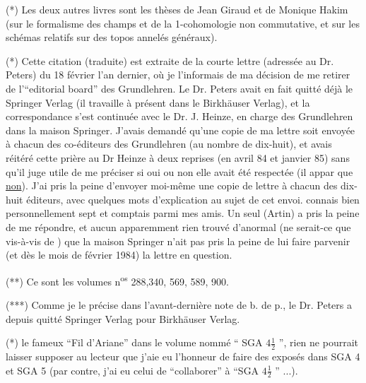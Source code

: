 (*\deleted{*}) Les deux autres livres sont les thèses de Jean Giraud et de  Monique Hakim (sur le formalisme des champs et de la 1-cohomologie non commutative, et sur les schémas relatifs sur des topos annelés généraux).

(*) Cette citation (traduite) est extraite de la courte lettre (adressée au Dr. Peters) du 18 février l'an dernier, où je l'informais de ma décision de me retirer de l'``editorial board'' des Grundlehren. Le Dr. Peters avait en fait quitté déjà le Springer Verlag (il travaille à présent dans le Birkhäuser Verlag), et la correspondance s'est continuée avec le  Dr. J. Heinze, en charge des Grundlehren dans la maison Springer. J'avais demandé qu'une copie de ma lettre soit envoyée à chacun des co-éditeurs des Grundlehren (au nombre de dix-huit), et avais réitéré cette prière\deleted{,} au Dr Heinze\deleted{,} à deux reprises (en avril 84 et janvier 85) sans qu'il juge utile de me  préciser si oui ou non elle avait été respectée (il  appar que \uline{non}). J'ai pris la peine d'envoyer moi-même une copie de  lettre  à chacun des dix-huit éditeurs, avec quelques mots d'explication  au sujet de cet envoi.  connais bien personnellement sept   et   comptais parmi mes amis. Un seul  (Artin) a pris la peine de me répondre, et aucun apparemment  rien trouvé d'anormal  (ne serait-ce que vis-à-vis de ) que la maison Springer n'ait pas pris la peine de lui faire parvenir   (et dès le mois de février 1984) la lettre en question.

(**\deleted{*}) Ce sont les volumes n\textsuperscript{os} 288,340, 569, 589, 900.

(***\deleted{*}) Comme je le précise dans l'avant-dernière note de b. de p., le Dr. Peters a depuis quitté Springer Verlag pour Birkhäuser Verlag.

(*)   le fameux ``Fil d'Ariane''  dans le volume nommé `` SGA $4\frac12$ '',  rien ne pourrait laisser supposer au lecteur que j'aie eu l'honneur de faire des exposés dans SGA 4 et SGA 5 (par contre, j'ai eu celui de ``collaborer'' à ``SGA $4\frac12$ '' ...).

